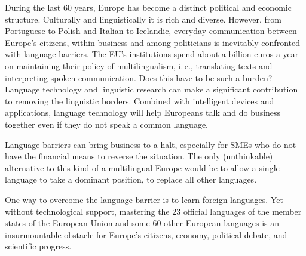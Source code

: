 \begin{multicols}{2}

During the last 60 years, Europe has become a distinct political and economic structure. Culturally and linguistically it is rich and diverse. However, from Portuguese to Polish and Italian to Icelandic, everyday communication between Europe’s citizens, within business and among politicians is inevitably confronted with language barriers. The EU's institutions spend about a billion euros a year on maintaining their policy of multilingualism, i.\,e., translating texts and interpreting spoken communication. Does this have to be such a burden? Language technology and linguistic research can make a significant contribution to removing the linguistic borders. Combined with intelligent devices and applications, language technology will help Europeans talk and do business together even if they do not speak a common language. 


Language barriers can bring business to a halt, especially for SMEs who do not have the financial means to reverse the situation. The only (unthinkable) alternative to this kind of a multilingual Europe would be to allow a single language to take a dominant position, to replace all other languages. 

One way to overcome the language barrier is to learn foreign languages. Yet without technological support, mastering the 23 official languages of the member states of the European Union and some 60 other European languages is an insurmountable obstacle for Europe’s citizens, economy, political debate, and scientific progress. 


\end{multicols}
